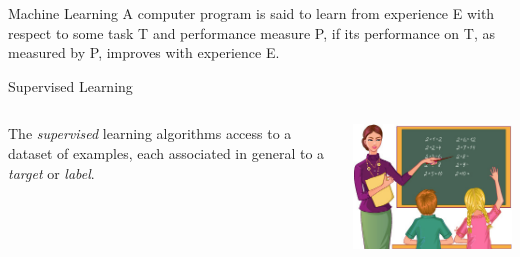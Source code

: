 \begin{frame}
\begin{center}
{\begin{tikzpicture}[ ->, node distance = 2.5cm,
					decoration = {snake,   %
                    pre length=3pt,post length=7pt,%
                    }]
\end{tikzpicture}
}
\end{center}

\begin{block}{Machine Learning}
\textquotedbl A computer program is said to learn from experience E with respect to some task T and performance measure P, if its performance on T, as measured by P, improves with experience E. \textquotedbl \cite{Mitchell1997}
\end{block}

\begin{block}{Supervised Learning}
\begin{columns}
    \begin{column}{.6\linewidth}
    The \emph{supervised} learning algorithms access to a dataset of examples, each associated in general to a \emph{target} or \emph{label}. 
    \end{column}
    \begin{column}{.3\linewidth}
\includegraphics[width=\textwidth]{figures/teacher.jpg}
    \end{column}
\end{columns}

\end{block}

\end{frame}

